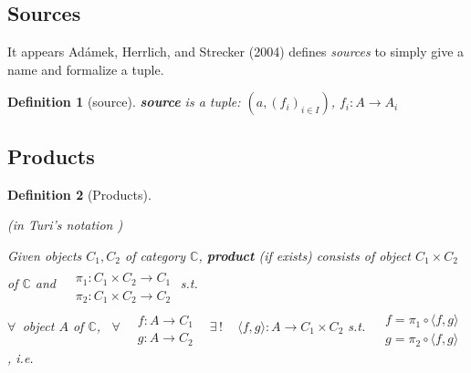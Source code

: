 \documentclass[10pt]{amsart}
\newtheorem{definition}{Definition}
\begin{document}
\begin{multicols*}{2}
\subsection{Sources}

It appears Ad\'{a}mek, Herrlich, and Strecker (2004) \cite{AHS2004} defines \emph{sources} to simply give a name and formalize a tuple.  

\begin{definition}[source]
	\textbf{source} is a tuple: $(a, (f_i)_{i\in I})$, $f_i:A\to A_i$
\end{definition}

\subsection{Products}

\begin{definition}[Products]\label{Def:Products}
	
	(in Turi's notation \cite{Turi2001})
	
	Given objects $C_1,C_2$ of category $\mathbb{C}$, \textbf{product} (if exists) consists of object $C_1 \times C_2$ of $\mathbb{C}$ and $\begin{aligned} & \quad \\
	& \pi_1 : C_1 \times C_2 \to C_1 \\
	& \pi_2: C_1 \times C_2 \to C_2 \end{aligned}$ s.t. \\
	$\forall \, $ object $A$ of $\mathbb{C}$, \, $\forall \, \begin{aligned} & \quad \\
	& f : A \to C_1 \\
	& g : A \to C_2 \end{aligned}$ \quad \, $\exists \, ! \quad \, \langle f,g \rangle : A \to C_1 \times C_2$ s.t. $\begin{aligned} & \quad \\
	& f = \pi_1 \circ \langle f,g \rangle \\
	& g = \pi_2 \circ \langle f,g \rangle \end{aligned}$, i.e. 
	
	

\end{definition}
\end{multicols*}
\end{document}
